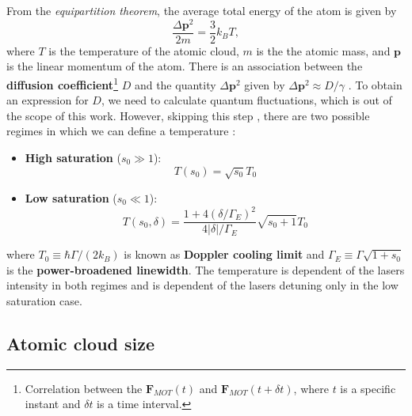 From the \textit{equipartition theorem}, the average total energy of the atom is given by
\begin{equation}
	\frac{\Delta \mathbf{p}^2}{2m} = \frac{3}{2} k_B T,
\end{equation}
where $ T $ is the temperature of the atomic cloud, $m$ is the the atomic mass, and $ \mathbf{p} $ is the linear momentum of the atom. There is an association between the \textbf{diffusion coefficient}\footnote{Correlation between the $\mathbf{F}_{MOT}(t) $ and $ \mathbf{F}_{MOT}(t + \delta t) $, where $ t $ is a specific instant and $ \delta t $ is a time interval.} $ D $ and the quantity $ \Delta \mathbf{p}^2 $ given by $ \Delta \mathbf{p}^2 \approx D / \gamma $ \cite[Section~2]{perrin2014doppler}. To obtain an expression for $ D $, we need to calculate quantum fluctuations, which is out of the scope of this work. However, skipping this step \cite[Section~2.3]{perrin2014doppler}, there are two possible regimes in which we can define a temperature \cite[Section~V]{loftus2004narrow}:
\begin{itemize}
	\item \textbf{High saturation} ($ s_0 \gg 1 $):
	\begin{equation}
		T(s_0) = \sqrt{s_0} T_0
		\label{eq:Doppler-temperature-high-saturation}
	\end{equation}
	\item \textbf{Low saturation} ($ s_0 \ll 1 $):
	\begin{equation}
		T(s_0, \delta) = \frac{1 + 4(\delta / \Gamma_E)^2}{4|\delta|/\Gamma_E} \sqrt{s_0 + 1} T_0
		\label{eq:Doppler-temperature-low-saturation}
	\end{equation}
\end{itemize}
where $ T_0 \equiv \hbar \Gamma / (2 k_B) $ is known as \textbf{Doppler cooling limit} and $ \Gamma_{E} \equiv \Gamma \sqrt{1 + s_0} $ is the \textbf{power-broadened linewidth}. The temperature is dependent of the lasers intensity in both regimes and is dependent of the lasers detuning only in the low saturation case.

\subsection{Atomic cloud size}
\label{sec:MOT-cloud-size}

